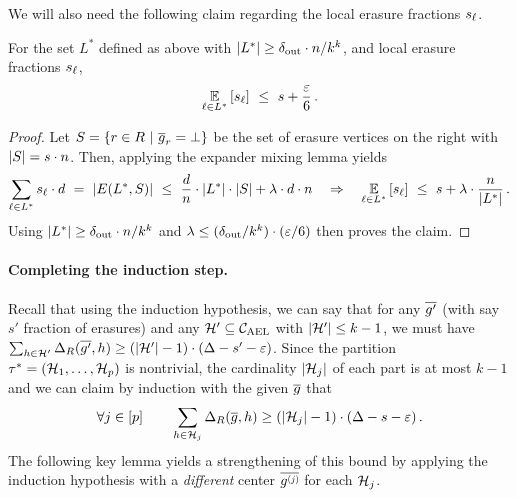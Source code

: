 We will also need the following claim regarding the local erasure fractions $\sl$.
%
\begin{claim}\label{claim:sampling_erasure}
For the set $L^*$ defined as above with $\abs{L^*} \geq \delta_{\out} \cdot n / k^k$, and local erasure fractions $\sl$,
\[
		\Ex{\ell\in L^*}{\sl} ~\leq~ s + \frac{\eps}{6} \mper
\]
\end{claim}
%
\begin{proof}
Let $S = \inbraces{r \in R ~|~ \erase{g}_r = \bot}$ be the set of erasure vertices on the right with $\abs{S} = s \cdot n$. 
Then, applying the expander mixing lemma yields
\[
\sum_{\ell \in L^*} \sl \cdot d ~=~ \abs{E(L^*,S)} ~\leq~ \frac{d}{n} \cdot \abs{L^*} \cdot \abs{S} + \lambda \cdot d \cdot n 
\quad\implies\quad
\Ex{\ell\in L^*}{\sl} ~\leq~ s + \lambda \cdot \frac{n}{\abs{L^*}} \mper
\]
Using $\abs{L^*} \geq \delta_{\out} \cdot n / k^k$ and $\lambda \leq (\delta_{\out}/k^k) \cdot (\eps/6)$ then proves the claim. 
\end{proof}
%

\vspace{-5 pt}
\paragraph{Completing the induction step.} 
%
Recall that using the induction hypothesis, we can say that for any $\erase{g'}$ (with say $s'$ fraction of erasures) and any $\calH' \subseteq \AELC$ with $\abs{\calH'} \leq k-1$, we must have $\sum_{h \in \calH'} \Delta_R(\erase{g'},h) \geq (\abs{\calH'}-1) \cdot (\Delta - s' - \eps)$.
%
%
Since the partition $\tau^* = (\calH_1, \ldots, \calH_p)$ is nontrivial, the cardinality $\abs{\calH_j}$ of each part is at most $k-1$ and we can claim by induction with the given $\erase{g}$ that
\[
\forall j \in [p] \qquad \sum_{h \in \calH_j} \Delta_R(\erase{g}, h) \geq (\abs{\calH_j}-1) \cdot (\Delta - s - \eps) \mper
\]
% 
The following key lemma yields a strengthening of this bound by applying the induction hypothesis with a \emph{different} center $\gj$ for each $\calH_j$.
%


